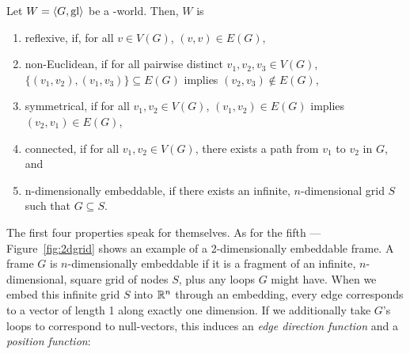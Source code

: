 \begin{definition}
	Let $W = \langle G,\mathrm{gl} \rangle$ be a \wext-world. Then, $W$ is
	\begin{enumerate}
		\item {\upshape reflexive}, if, for all $v \in V(G)$, $(v,v) \in E(G)$,
		\item {\upshape non-Euclidean}, if for all pairwise distinct $v_1,v_2,v_3 \in V(G)$, $\{(v_1,v_2),(v_1,v_3)\} \subseteq E(G)$ implies $(v_2,v_3) \notin E(G)$,
		\item {\upshape symmetrical}, if for all $v_1,v_2 \in V(G)$, $(v_1,v_2) \in E(G)$ implies $(v_2,v_1) \in E(G)$,
		\item {\upshape connected}, if for all $v_1,v_2 \in V(G)$, there exists a path from $v_1$ to $v_2$ in $G$, and
		\item {\upshape n-dimensionally embeddable}, if there exists an infinite, $n$-dimensional grid $S$ such that $G \subseteq S$.%
	\end{enumerate}
\end{definition}

The first four properties speak for themselves. As for the fifth --- Figure~\ref{fig:2dgrid} shows an example of a 2-dimensionally embeddable frame. A frame $G$ is $n$-dimensionally embeddable if it is a fragment of an infinite, $n$-dimensional, square grid of nodes $S$, plus any loops $G$ might have. When we embed this infinite grid $S$ into $\mathbb{R}^n$ through an embedding, every edge corresponds to a vector of length 1 along exactly one dimension. If we additionally take $G$'s loops to correspond to null-vectors, this induces an {\em edge direction function} and a {\em position function}:

